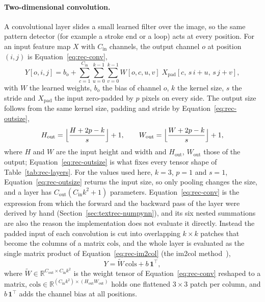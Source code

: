 \paragraph{Two-dimensional convolution.}
A convolutional layer slides a small learned filter over the image, so the same pattern detector (for example a stroke end or a loop) acts at every position.
For an input feature map $X$ with $C_{\mathrm{in}}$ channels, the output channel $o$ at position $(i,j)$ is Equation~\ref{eq:rec-conv},
\begin{equation}
Y[o,i,j]=b_o+\sum_{c=1}^{C_{\mathrm{in}}}\sum_{u=0}^{k-1}\sum_{v=0}^{k-1}W[o,c,u,v]\;X_{\mathrm{pad}}[c,\,s\,i+u,\,s\,j+v],
\label{eq:rec-conv}
\end{equation}
with $W$ the learned weights, $b_o$ the bias of channel $o$, $k$ the kernel size, $s$ the stride and $X_{\mathrm{pad}}$ the input zero-padded by $p$ pixels on every side.
The output size follows from the same kernel size, padding and stride by Equation~\ref{eq:rec-outsize},
\begin{equation}
H_{\mathrm{out}}=\Bigl\lfloor\frac{H+2p-k}{s}\Bigr\rfloor+1,\qquad W_{\mathrm{out}}=\Bigl\lfloor\frac{W+2p-k}{s}\Bigr\rfloor+1,
\label{eq:rec-outsize}
\end{equation}
where $H$ and $W$ are the input height and width and $H_{\mathrm{out}}$, $W_{\mathrm{out}}$ those of the output; Equation~\ref{eq:rec-outsize} is what fixes every tensor shape of Table~\ref{tab:rec-layers}.
For the values used here, $k=3$, $p=1$ and $s=1$, Equation~\ref{eq:rec-outsize} returns the input size, so only pooling changes the size, and a layer has $C_{\mathrm{out}}(C_{\mathrm{in}}k^2+1)$ parameters.
Equation~\ref{eq:rec-conv} is the expression from which the forward and the backward pass of the layer were derived by hand (Section~\ref{sec:textrec-numpynn}), and its six nested summations are also the reason the implementation does not evaluate it directly.
Instead the padded input of each convolution is cut into overlapping $k\times k$ patches that become the columns of a matrix $\mathrm{cols}$, and the whole layer is evaluated as the single matrix product of Equation~\ref{eq:rec-im2col} (the im2col method~\cite{chellapilla2006}),
\begin{equation}
Y=\tilde W\,\mathrm{cols}+b\,\mathbf 1^{\top},
\label{eq:rec-im2col}
\end{equation}
where $\tilde W\in\mathbb R^{C_{\mathrm{out}}\times C_{\mathrm{in}}k^2}$ is the weight tensor of Equation~\ref{eq:rec-conv} reshaped to a matrix, $\mathrm{cols}\in\mathbb R^{(C_{\mathrm{in}}k^2)\times(H_{\mathrm{out}}W_{\mathrm{out}})}$ holds one flattened $3\times3$ patch per column, and $b\,\mathbf 1^\top$ adds the channel bias at all positions.
